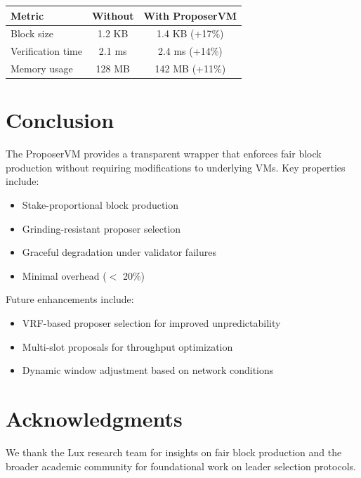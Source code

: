 \documentclass[11pt,letterpaper]{article}
\begin{document}
\begin{center}
\begin{tabular}{lcc}
\toprule
\textbf{Metric} & \textbf{Without} & \textbf{With ProposerVM} \\
\midrule
Block size & 1.2 KB & 1.4 KB (+17\%) \\
Verification time & 2.1 ms & 2.4 ms (+14\%) \\
Memory usage & 128 MB & 142 MB (+11\%) \\
\bottomrule
\end{tabular}
\end{center}

\section{Conclusion}

The ProposerVM provides a transparent wrapper that enforces fair block production without requiring modifications to underlying VMs. Key properties include:

\begin{itemize}
    \item Stake-proportional block production
    \item Grinding-resistant proposer selection
    \item Graceful degradation under validator failures
    \item Minimal overhead ($<$ 20\%)
\end{itemize}

Future enhancements include:
\begin{itemize}
    \item VRF-based proposer selection for improved unpredictability
    \item Multi-slot proposals for throughput optimization
    \item Dynamic window adjustment based on network conditions
\end{itemize}

\section*{Acknowledgments}

We thank the Lux research team for insights on fair block production and the broader academic community for foundational work on leader selection protocols.
\end{document}
